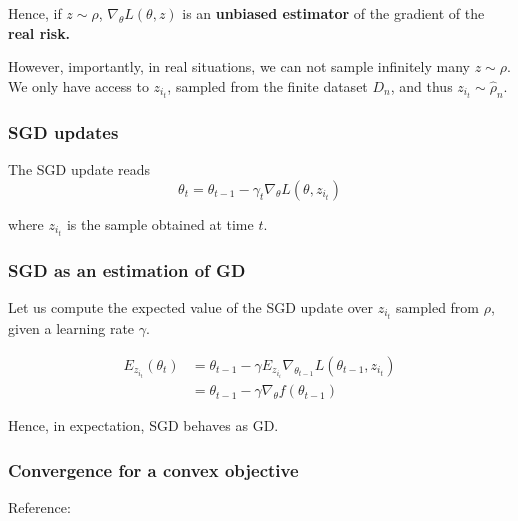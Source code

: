 \documentclass[
10pt, %
a4paper, %
oneside, %
headinclude,footinclude, %
BCOR5mm, %
]{scrartcl}
\begin{document}
Hence, if $z\sim \rho$, $\nabla_{\theta}L(\theta, z)$ is an \textbf{{unbiased estimator}} of the gradient of the \textbf{{real risk.}} 

However, importantly, in real situations, we can not sample infinitely many $z\sim \rho$. We only have access to $z_{i_t}$, sampled from the finite dataset $D_n$, and thus $z_{i_t}\sim \hat{\rho}_n$.

\subsubsection{\large\color{Periwinkle}SGD updates}

The SGD update reads
\begin{equation*}
    \theta_t = \theta_{t-1}-\gamma_t \nabla_{\theta} L(\theta, z_{i_t})
\end{equation*}

where $z_{i_t}$ is the sample obtained at time $t$.

\subsubsection{\large\color{Periwinkle}SGD as an estimation of GD}

Let us compute the expected value of the SGD update over $z_{i_t}$ sampled from $\rho$, given a learning rate $\gamma$.

\begin{equation*}
    \begin{aligned}
	E_{z_{i_t}}(\theta_t) &= \theta_{t-1} - \gamma E_{z_{i_i}} \nabla_{\theta_{t-1}} L(\theta_{t-1}, z_{i_t})\\
	&= \theta_{t-1} - \gamma \nabla_{\theta} f(\theta_{t-1})
    \end{aligned}
\end{equation*}

Hence, in expectation, SGD behaves as GD.


\subsubsection{\large\color{Periwinkle}Convergence for a convex objective}

Reference: \cite[]{Bach2021} 
\end{document}
